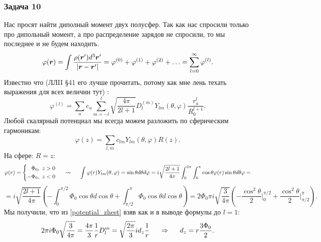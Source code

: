 \subsubsection*{Задача 10}
Нас просят найти диполный момент двух полусфер.
Так как нас спросили только про дипольный момент, а про распределение зарядов не спросили, то мы последнее и не будем находить.
\begin{equation*}
	\varphi(\mbox{\boldmath $r$}) = \int \frac{\rho(\mbox{\boldmath $r$}') d^3 \mbox{\boldmath $r$}'}{|\mbox{\boldmath $r$} - \mbox{\boldmath $r$}'|}
	 = \varphi^{(0)} + \varphi^{(1)} + \varphi^{(2)} + \ldots = \sum_{l=0}^\infty \varphi^{(l)}.
\end{equation*}
Известно что (ЛЛII \S 41 его лучше прочитать, потому как мне лень техать выражения для всех величин тут) :
\begin{equation}
	\varphi^{(l)} = \sum_a e_a\sum_{m = -l}^l \sqrt{\frac{4 \pi}{2 l +1}} D_l^{(m)} Y_{l m} (\theta, \varphi) \frac{r_a^l}{R_0^{l+1}}.
	\label{potential_zhest}
\end{equation}
Любой скалярный потенциал мы всегда можем разложить по сферическим гармоникам:
\begin{equation*}
	\varphi(z) = \sum_{l,m} c_{lm} Y_{lm}(\theta,\varphi) R(z).
\end{equation*}
На сфере: $R=z$:
\begin{equation*}
 \varphi(r) =
	\left\{
	\begin{aligned}
		\Phi_0, \ z>0 \\
		-\Phi_0, \ z<0
	\end{aligned}
	\right.
	\hspace{0.5 cm}
	\leadsto
	\hspace{0.5 cm}
	\int \varphi(r) Y_{l m} (\theta, \varphi) = \sin \theta d \theta d\varphi
	=
	i \sqrt{\frac{2 l +1}{4 \pi}} \int_0^{2\pi} \int_0^\pi \cos \theta \varphi(r) \sin \theta d \theta \varphi =
\end{equation*}
\begin{equation*}
	= i \sqrt{\frac{2 l +1}{4 \pi}} \left(
	-\int_0^{\pi/2} \Phi_0 \cos \theta d \cos \theta + \int_{\pi/2}^\pi \Phi_0 \cos \theta d \cos \theta
	\right)
	=
	2 \Phi_0 \pi i \sqrt{\frac{3}{4 \pi}}\left(
	- \frac{\cos ^2 \theta}{2}\bigg|_0^{\pi/2} + \frac{\cos^2 \theta}{2}\bigg|_{\pi/2}^\pi 
	\right).
\end{equation*}
Мы получили, что из \eqref{potential_zhest} взяв как и в выводе формулы до $l=1$:
\begin{equation*}
	2 \pi i \Phi_0 \sqrt{\frac{3}{4\pi}} = \frac{4 \pi}{3} \frac{1}{r} D_l^m = \sqrt{\frac{2 \pi}{3}} i d_z \frac{1}{r}
	\hspace{0.5 cm}
	\Rightarrow
	\hspace{0.5 cm}
	d_z = r \frac{3 \Phi_0}{2}.
\end{equation*}